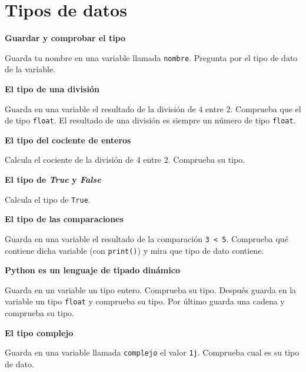 \documentclass[a4paper, 11pt]{scrartcl}
\begin{document}
\newpage


\section{Tipos de datos}





\noindent\textbf{\sffamily Guardar y comprobar el tipo}

Guarda tu nombre en una variable llamada \verb|nombre|. Pregunta por el tipo de dato de la variable.





\noindent\textbf{\sffamily El tipo de una división}

Guarda en una variable el resultado de la división de 4 entre 2. Comprueba que el de tipo \verb|float|. El resultado de una división es siempre un número de tipo \verb|float|.





\noindent\textbf{\sffamily El tipo del cociente de enteros}

Calcula el cociente de la división de 4 entre 2. Comprueba su tipo.





\noindent\textbf{\sffamily El tipo de \textit{True} y \textit{ False}}

Calcula el tipo de \verb|True|.





\noindent\textbf{\sffamily El tipo de las comparaciones}

Guarda en una variable el resultado de la comparación \verb|3 < 5|.  Comprueba qué contiene dicha variable (con \verb|print()|)  y mira que tipo de dato contiene.





\noindent\textbf{\sffamily Python es un lenguaje de tipado dinámico}

Guarda en un variable un tipo entero. Comprueba su tipo. Después guarda en la variable un tipo \verb|float| y comprueba su tipo. Por último guarda una cadena y comprueba su tipo.





\noindent\textbf{\sffamily \dag{} El tipo complejo}

 Guarda en una variable llamada \verb|complejo| el valor \verb|1j|. Comprueba cual es su tipo de dato.
\end{document}
